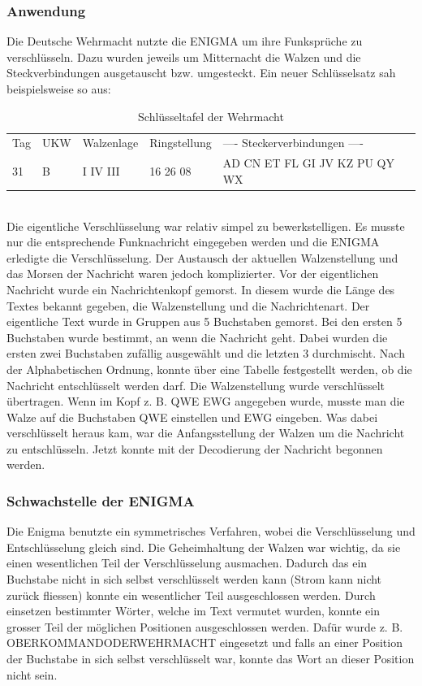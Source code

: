 \subsubsection{Anwendung}
Die Deutsche Wehrmacht nutzte die ENIGMA um ihre Funksprüche zu verschlüsseln. Dazu wurden jeweils um Mitternacht die Walzen und die Steckverbindungen ausgetauscht bzw. umgesteckt. Ein neuer Schlüsselsatz sah beispielsweise so aus:\\
%
\begin{table}[ht]
\caption{Schlüsseltafel der Wehrmacht}
\begin{center}
\begin{tabular}{|l|l|l|l|l}
Tag & UKW & Walzenlage & Ringstellung &  ---- Steckerverbindungen ---- \\
 31  &   B   &  I   IV III   &    16 26 08   &  AD CN ET FL GI JV KZ PU QY WX \\
\end{tabular}
\end{center}
\end{table}
%
\\
Die eigentliche Verschlüsselung war relativ simpel zu bewerkstelligen. Es musste nur die entsprechende Funknachricht eingegeben werden und die ENIGMA erledigte die Verschlüsselung. Der Austausch der aktuellen Walzenstellung und das Morsen der Nachricht waren jedoch komplizierter.
%
Vor der eigentlichen Nachricht wurde ein Nachrichtenkopf gemorst. In diesem wurde die Länge des Textes bekannt gegeben, die Walzenstellung und die Nachrichtenart. 
Der eigentliche Text wurde in Gruppen aus 5 Buchstaben gemorst. Bei den ersten 5 Buchstaben wurde bestimmt, an wenn die Nachricht geht. Dabei wurden die ersten zwei Buchstaben zufällig ausgewählt und die letzten 3 durchmischt. Nach der Alphabetischen Ordnung, konnte über eine Tabelle festgestellt werden, ob die Nachricht entschlüsselt werden darf.
Die Walzenstellung wurde verschlüsselt übertragen. Wenn im Kopf z. B. QWE EWG angegeben wurde, musste man die Walze auf die Buchstaben QWE einstellen und EWG eingeben. Was dabei verschlüsselt heraus kam, war die Anfangsstellung der Walzen um die Nachricht zu entschlüsseln. Jetzt konnte mit der Decodierung der Nachricht begonnen werden.
%
\subsubsection{Schwachstelle der ENIGMA}
Die Enigma benutzte ein symmetrisches Verfahren, wobei die Verschlüsselung und Entschlüsselung gleich sind. %
Die Geheimhaltung der Walzen war wichtig, da sie einen wesentlichen Teil der Verschlüsselung ausmachen.
Dadurch das ein Buchstabe nicht in sich selbst verschlüsselt werden kann (Strom kann nicht zurück fliessen) konnte ein wesentlicher Teil ausgeschlossen werden.
Durch einsetzen bestimmter Wörter, welche im Text vermutet wurden, konnte ein grosser Teil der möglichen Positionen ausgeschlossen werden. Dafür wurde z. B. OBERKOMMANDODERWEHRMACHT eingesetzt und falls an einer Position der Buchstabe in sich selbst verschlüsselt war, konnte das Wort an dieser Position nicht sein.
%
